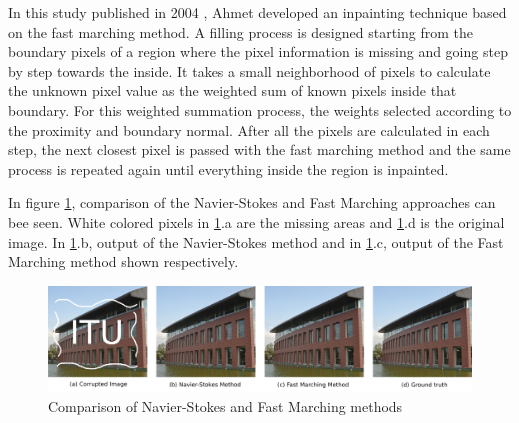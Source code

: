 In this study published in 2004 \cite{telea}, Ahmet developed an inpainting technique based on the fast marching method. A filling process is designed starting from the boundary pixels of a region where the pixel information is missing and going step by step towards the inside. It takes a small neighborhood of pixels to calculate the unknown pixel value as the weighted sum of known pixels inside that boundary. For this weighted summation process, the weights selected according to the proximity and boundary normal. After all the pixels are calculated in each step, the next closest pixel is passed with the fast marching method and the same process is repeated again until everything inside the region is inpainted.

In figure \ref{fig:traditional_comparison}, comparison of the Navier-Stokes and Fast Marching approaches can bee seen. White colored pixels in \ref{fig:traditional_comparison}.a are the missing areas and \ref{fig:traditional_comparison}.d is the original image. In \ref{fig:traditional_comparison}.b, output of the Navier-Stokes method and in \ref{fig:traditional_comparison}.c, output of the Fast Marching method shown respectively.

\begin{figure}[h]
    \centering
    \includegraphics[width=14cm]{figures/traditional_comparison.png}
    \caption{Comparison of Navier-Stokes and Fast Marching methods}
    \label{fig:traditional_comparison}
\end{figure}
